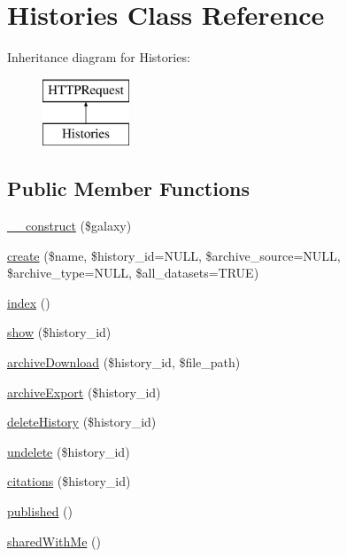 \hypertarget{classHistories}{}\section{Histories Class Reference}
\label{classHistories}
Inheritance diagram for Histories\+:\begin{figure}[H]
\begin{center}
\leavevmode
\includegraphics[height=2.000000cm]{classHistories}
\end{center}
\end{figure}
\subsection*{Public Member Functions}
\begin{DoxyCompactItemize}
\item 
\hyperlink{classHistories_a27eb8affae85703d91bcb7d617209e66}{\+\_\+\+\_\+construct} (\$galaxy)
\item 
\hyperlink{classHistories_a69e4b7e9bde24290c1d40c29cd69a358}{create} (\$name, \$history\+\_\+id=N\+U\+LL, \$archive\+\_\+source=N\+U\+LL, \$archive\+\_\+type=N\+U\+LL, \$all\+\_\+datasets=T\+R\+UE)
\item 
\hyperlink{classHistories_a43a92a2839e481a5f39b6444971e616f}{index} ()
\item 
\hyperlink{classHistories_a5f32d9aa6597f3876fc9291614dae85a}{show} (\$history\+\_\+id)
\item 
\hyperlink{classHistories_acbd17070f53a4326029374878760846d}{archive\+Download} (\$history\+\_\+id, \$file\+\_\+path)
\item 
\hyperlink{classHistories_addacbe6d8744835911f6547d4b935b41}{archive\+Export} (\$history\+\_\+id)
\item 
\hyperlink{classHistories_a97773d15901aea83dc44ea8d15e98e8b}{delete\+History} (\$history\+\_\+id)
\item 
\hyperlink{classHistories_aa0317b96601a7a6b4ca607770714c821}{undelete} (\$history\+\_\+id)
\item 
\hyperlink{classHistories_aa613fec2475a87da10e7cabc7cf3b4c0}{citations} (\$history\+\_\+id)
\item 
\hyperlink{classHistories_a6fbbf74042939c393cf7163b481cd0b1}{published} ()
\item 
\hyperlink{classHistories_af5cc87c475e5b864af68772dd3329a82}{shared\+With\+Me} ()
\end{DoxyCompactItemize}
